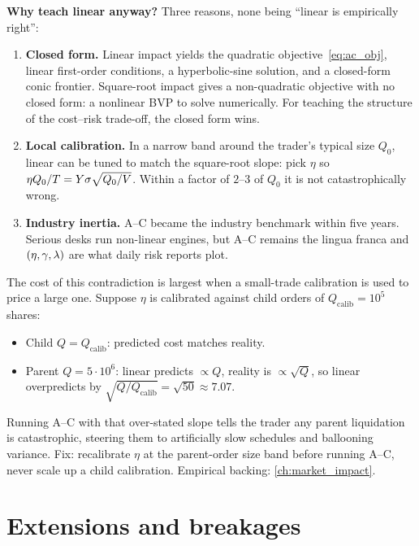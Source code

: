 \textbf{Why teach linear anyway?} Three reasons, none being
``linear is empirically right'':
\begin{enumerate}
  \item \textbf{Closed form.} Linear impact yields the quadratic
  objective~\eqref{eq:ac_obj}, linear first-order conditions, a
  hyperbolic-sine solution, and a closed-form conic frontier.
  Square-root impact gives a non-quadratic objective with no
  closed form: a nonlinear BVP to solve numerically. For teaching
  the structure of the cost--risk trade-off, the closed form wins.
  \item \textbf{Local calibration.} In a narrow band around the
  trader's typical size $Q_0$, linear can be tuned to match the
  square-root slope: pick $\eta$ so $\eta Q_0/T = Y\sigma\sqrt{Q_0/V}$.
  Within a factor of $2$--$3$ of $Q_0$ it is not catastrophically
  wrong.
  \item \textbf{Industry inertia.} A--C became the industry
  benchmark within five years. Serious desks run non-linear
  engines, but A--C remains the lingua franca and
  $(\eta, \gamma, \lambda)$ are what daily risk reports plot.
\end{enumerate}

\begin{pitfallbox}
The cost of this contradiction is largest when a small-trade
calibration is used to price a large one. Suppose $\eta$ is
calibrated against child orders of $Q_{\text{calib}} = 10^5$ shares:
\begin{itemize}
  \item Child $Q = Q_{\text{calib}}$: predicted cost matches reality.
  \item Parent $Q = 5\cdot 10^6$: linear predicts $\propto Q$,
  reality is $\propto \sqrt{Q}$, so linear overpredicts by
  $\sqrt{Q/Q_{\text{calib}}} = \sqrt{50} \approx 7.07$.
\end{itemize}
Running A--C with that over-stated slope tells the trader any
parent liquidation is catastrophic, steering them to artificially
slow schedules and ballooning variance. Fix: recalibrate $\eta$
at the parent-order size band before running A--C, never scale up
a child calibration. Empirical backing: \cref{ch:market_impact}.
\end{pitfallbox}

\section{Extensions and breakages}
\label{sec:ac_extensions}

